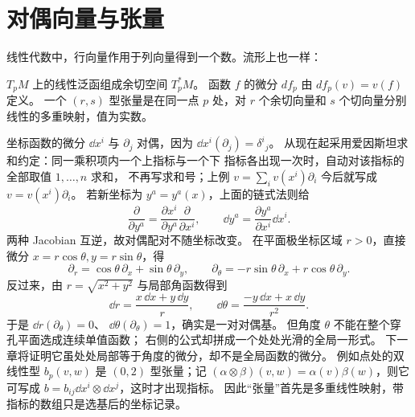 \section{对偶向量与张量}

线性代数中，行向量作用于列向量得到一个数。流形上也一样：
\begin{definition}[余切向量与张量]
\(T_pM\) 上的线性泛函组成余切空间 \(T_p^*M\)。
函数 \(f\) 的微分 \(df_p\) 由 \(df_p(v)=v(f)\) 定义。
一个 \((r,s)\) 型张量是在同一点 \(p\) 处，对 \(r\) 个余切向量和
\(s\) 个切向量分别线性的多重映射，值为实数。
\end{definition}

坐标函数的微分 \(\dd x^i\) 与 \(\partial_j\) 对偶，因为
\(\dd x^i(\partial_j)=\delta^i{}_j\)。
从现在起采用爱因斯坦求和约定：同一乘积项内一个上指标与一个下
指标各出现一次时，自动对该指标的全部取值 \(1,\dots,n\) 求和，
不再写求和号；上例 \(v=\sum_i v(x^i)\partial_i\) 今后就写成
\(v=v(x^i)\partial_i\)。
若新坐标为 \(y^a=y^a(x)\)，上面的链式法则给
\[
\frac{\partial}{\partial y^a}
=\frac{\partial x^i}{\partial y^a}\frac{\partial}{\partial x^i},
\qquad
\dd y^a=\frac{\partial y^a}{\partial x^i}\dd x^i .
\]
两种 Jacobian 互逆，故对偶配对不随坐标改变。
在平面极坐标区域 \(r>0\)，直接微分
\(x=r\cos\theta,y=r\sin\theta\)，得
\[
\partial_r=\cos\theta\,\partial_x+\sin\theta\,\partial_y,
\qquad
\partial_\theta=-r\sin\theta\,\partial_x
+r\cos\theta\,\partial_y.
\]
反过来，由 \(r=\sqrt{x^2+y^2}\) 与局部角函数得到
\[
\dd r=\frac{x\,\dd x+y\,\dd y}{r},
\qquad
\dd \theta=\frac{-y\,\dd x+x\,\dd y}{r^2}.
\]
于是 \(\dd r(\partial_\theta)=0\)、
\(\dd \theta(\partial_\theta)=1\)，确实是一对对偶基。
但角度 \(\theta\) 不能在整个穿孔平面选成连续单值函数；
右侧的公式却拼成一个处处光滑的全局一形式。
下一章将证明它虽处处局部等于角度的微分，却不是全局函数的微分。
例如点处的双线性型 \(b_p(v,w)\) 是 \((0,2)\) 型张量；记
\((\alpha\otimes\beta)(v,w)=\alpha(v)\beta(w)\)，则它可写成
\(b=b_{ij}\dd x^i\otimes \dd x^j\)，这时才出现指标。
因此“张量”首先是多重线性映射，带指标的数组只是选基后的坐标记录。
